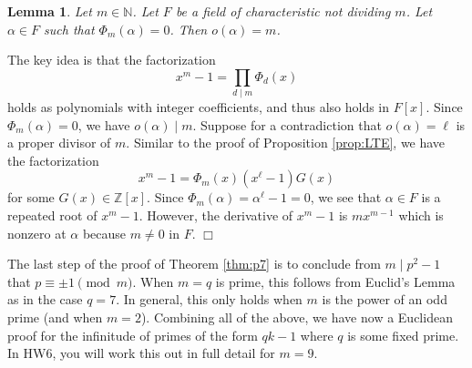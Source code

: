 \documentclass{article}
\def\Z{{\mathbb Z}}
\def\N{{\mathbb N}}
\def\Z{{\mathbb Z}}
\newtheorem{lemma}[subsection]{Lemma}
\newenvironment{proof}{\noindent {\bf Proof:}}{$\Box$ \vspace{2 ex}}
\begin{document}
\begin{lemma}
    Let $m\in\N$. Let $F$ be a field of characteristic not dividing $m$. Let $\alpha\in F$ such that $\Phi_m(\alpha) = 0$. Then $o(\alpha) = m$. 
\end{lemma}
\begin{proof}
    The key idea is that the factorization $$x^m - 1 = \prod_{d\mid m}\Phi_d(x)$$
    holds as polynomials with integer coefficients, and thus also holds in $F[x]$. Since $\Phi_m(\alpha) = 0$, we have $o(\alpha)\mid m$. Suppose for a contradiction that $o(\alpha) = \ell$ is a proper divisor of $m$. Similar to the proof of Proposition \ref{prop:LTE}, we have the factorization
    $$x^m - 1 = \Phi_m(x) (x^\ell-1) G(x)$$
    for some $G(x)\in\Z[x]$. Since $\Phi_m(\alpha) = \alpha^\ell - 1 = 0$, we see that $\alpha\in F$ is a repeated root of $x^m - 1$. However, the derivative of $x^m - 1$ is $mx^{m-1}$ which is nonzero at $\alpha$ because $m\neq 0$ in $F$.
\end{proof}

The last step of the proof of Theorem \ref{thm:p7} is to conclude from $m\mid p^2 - 1$ that $p\equiv \pm1\pmod{m}$. When $m = q$ is prime, this follows from Euclid's Lemma as in the case $q = 7$. In general, this only holds when $m$ is the power of an odd prime (and when $m = 2$). Combining all of the above, we have now a Euclidean proof for the infinitude of primes of the form $qk - 1$ where $q$ is some fixed prime. In HW6, you will work this out in full detail for $m = 9$. 
\end{document}
